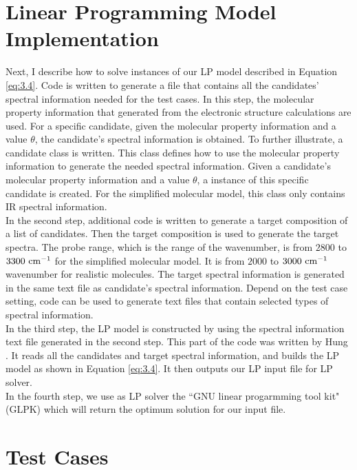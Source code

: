 \section{Linear Programming Model Implementation}

Next, I describe how to solve instances of our LP model described in Equation \ref{eq:3.4}. Code is written to generate a file that contains all the candidates' spectral information needed for the test cases. In this step, the molecular property information that generated from the electronic structure calculations are used. For a specific candidate, given the molecular property information and a value $\theta$, the candidate's spectral information is obtained. To further illustrate, a candidate class is written. This class defines how to use the molecular property information to generate the needed spectral information. Given a candidate's molecular property information and a value $\theta$, a instance of this specific candidate is created. For the simplified molecular model, this class only contains IR spectral information. \\

In the second step, additional code is written to generate a target composition of a list of candidates. Then the target composition is used to generate the target spectra. The probe range, which is the range of the wavenumber, is from $2800$  to $3300~\rm cm^{-1}$ for the                    simplified molecular model. It is from $2000$ to $3000~\rm cm^{-1}$ wavenumber for realistic molecules. The target spectral information is generated in the same text file as candidate's spectral information. Depend on the test case setting, code can be used to generate text files that contain selected types of spectral information. \\

In the third step, the LP model is constructed by using the spectral information text file generated in the second step. This part of the code was written by Hung \cite{KuoKaiHung:Thesis:2015}. It reads all the candidates and target spectral information, and builds the LP model as shown in Equation \ref{eq:3.4}. It then outputs our LP input file for LP solver. \\

In the fourth step, we use as LP solver the ``GNU linear progarmming tool kit" (GLPK) which will return the optimum solution for our input file. \\

\section{Test Cases}


